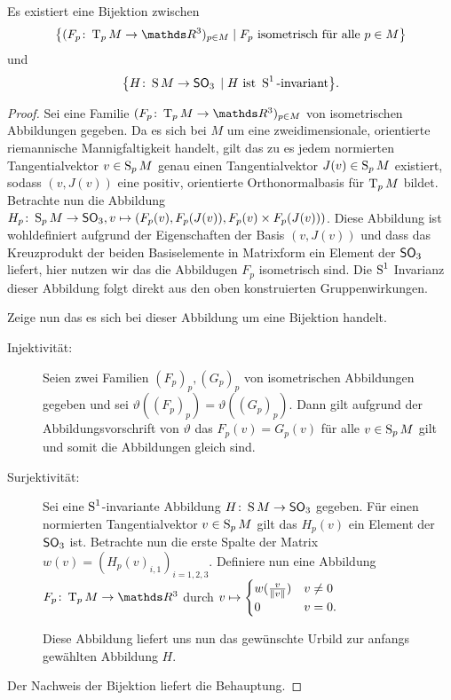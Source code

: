 \begin{Satz}
  Es existiert eine Bijektion zwischen
  \begin{gather*}
    \set{ (\abb{F_p}{\T_pM}{\R^3})_{p\in M} }{ F_p \text{ isometrisch
        für alle }p \in M}
  \end{gather*}
  und
  \begin{gather*}
    \set{ \abb{H}{\S M}{\so_3}}{H\text{ ist }\S^1 \text{-invariant}}.
  \end{gather*}
  \begin{proof}
    Sei eine Familie $(\abb{F_p}{\T_pM}{\R^3})_{p\in M}$ von
    isometrischen Abbildungen gegeben.  Da es sich bei $M$ um eine
    zweidimensionale, orientierte riemannische Mannigfaltigkeit
    handelt, gilt das zu es jedem normierten Tangentialvektor
    $v \in \S_p M$ genau einen Tangentialvektor $J(v) \in \S_p M$
    existiert, sodass $(v,J(v))$ eine positiv, orientierte
    Orthonormalbasis für $\tang{p}{M}$ bildet. Betrachte nun die
    Abbildung $\abb{H_p}{\S_p%
      M}{\so_3}, v \mapsto (F_p(v),F_p(J(v)),F_p(v)\times F_p(J(v)))$.
    Diese Abbildung ist wohldefiniert aufgrund der Eigenschaften der
    Basis $(v,J(v))$ und dass das Kreuzprodukt der beiden
    Basiselemente in Matrixform ein Element der $\so_3$ liefert, hier nutzen wir das die Abbildugen $ F_p $ isometrisch sind.  Die
    $\S^1$ Invarianz dieser Abbildung folgt direkt aus den oben
    konstruierten Gruppenwirkungen.   
	
    Zeige nun das es sich bei dieser Abbildung um eine Bijektion
    handelt.
    \begin{description}
    \item[Injektivität:] Seien zwei Familien $(F_p)_p,(G_p)_p$ von
      isometrischen Abbildungen gegeben und sei
      $\vartheta((F_p)_p)=\vartheta((G_p)_p)$. Dann gilt aufgrund der
      Abbildungsvorschrift von $\vartheta$ das $F_p(v)=G_p(v)$ für
      alle $v \in \S_p M$ gilt und somit die Abbildungen gleich sind.
    \item[Surjektivität:] Sei eine $\S^1$-invariante Abbildung
      $\abb{H}{\S M}{\so_3}$ gegeben. Für einen normierten
      Tangentialvektor $v \in \S_p M$ gilt das $H_p(v)$ ein Element
      der $\so_3$ ist. Betrachte nun die erste Spalte der Matrix
      $w(v)=(H_p(v)_{i,1})_{i=1,2,3}$. Definiere nun eine Abbildung
      $\abb{F_p}{\tang{p}{M}}{\R^3}$ durch  $v \mapsto \begin{cases}
        w(\frac{v}{\norm{v}}) & v \neq 0 \\
        0 & v=0.
      \end{cases}$
		
      Diese Abbildung liefert uns nun das gewünschte Urbild zur
      anfangs gewählten Abbildung $H$.
    \end{description}
    Der Nachweis der Bijektion liefert die Behauptung.
\end{proof}

\end{Satz}

